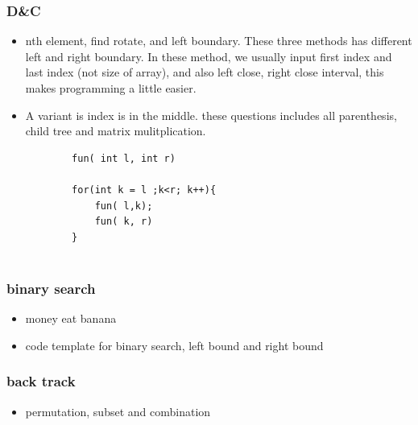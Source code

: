 \documentclass[a4paper,11pt,twoside]{book}
\begin{document}
\subsubsection{D\&C}
\begin{itemize}
	\item nth element, find rotate, and left boundary. These three methods has different left and right boundary.  In these method, we usually input first index and last index (not size of array), and also left close, right close interval, this makes programming a little easier. 
	
	\item A variant is index is in the middle. these questions includes all parenthesis, child tree and matrix mulitplication.
	\begin{lstlisting}
		fun( int l, int r)
		
		for(int k = l ;k<r; k++){
			fun( l,k);
			fun( k, r)
		}	
		
	\end{lstlisting}
\end{itemize}


\subsubsection{binary search}
\begin{itemize}
	\item money eat banana 
	
	\item code template for binary search, left bound and right bound
\end{itemize}

\subsubsection{back track}
\begin{itemize}
	\item permutation, subset and combination 
\end{itemize}
\end{document}
